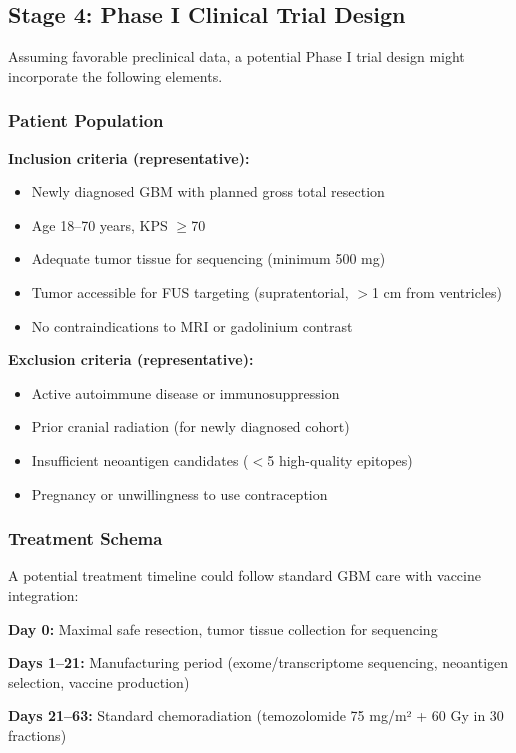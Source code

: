 \documentclass[12pt]{article}
\begin{document}
\subsection{Stage 4: Phase I Clinical Trial Design}
Assuming favorable preclinical data, a potential Phase I trial design might incorporate the following elements.

\subsubsection{Patient Population}
\textbf{Inclusion criteria (representative):}
\begin{itemize}[leftmargin=*,noitemsep]
\item Newly diagnosed GBM with planned gross total resection
\item Age 18--70 years, KPS $\geq$70
\item Adequate tumor tissue for sequencing (minimum 500 mg)
\item Tumor accessible for FUS targeting (supratentorial, $>$1 cm from ventricles)
\item No contraindications to MRI or gadolinium contrast
\end{itemize}

\textbf{Exclusion criteria (representative):}
\begin{itemize}[leftmargin=*,noitemsep]
\item Active autoimmune disease or immunosuppression
\item Prior cranial radiation (for newly diagnosed cohort)
\item Insufficient neoantigen candidates ($<$5 high-quality epitopes)
\item Pregnancy or unwillingness to use contraception
\end{itemize}

\subsubsection{Treatment Schema}
A potential treatment timeline could follow standard GBM care with vaccine integration:

\textbf{Day 0:} Maximal safe resection, tumor tissue collection for sequencing

\textbf{Days 1--21:} Manufacturing period (exome/transcriptome sequencing, neoantigen selection, vaccine production)

\textbf{Days 21--63:} Standard chemoradiation (temozolomide 75 mg/m² + 60 Gy in 30 fractions)
\end{document}
